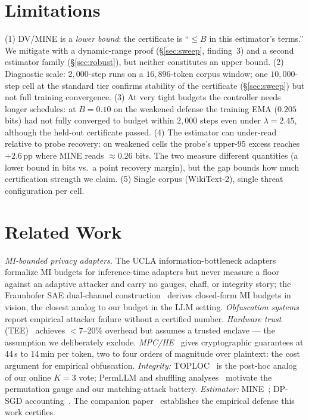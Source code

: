\documentclass[10pt]{article}
\begin{document}
\section{Limitations}
\label{sec:limits}
(1) DV/MINE is a \emph{lower bound}: the certificate is ``$\le B$ in this
estimator's terms.''  We mitigate with a dynamic-range proof
(\S\ref{sec:sweep}, finding~3) and a second estimator family
(\S\ref{sec:robust}), but neither constitutes an upper bound.
(2) Diagnostic scale: $2{,}000$-step runs on a $16{,}896$-token corpus
window; one $10{,}000$-step cell at the standard tier confirms stability
of the certificate (\S\ref{sec:sweep}) but not full training
convergence.
(3) At very tight budgets the controller needs longer schedules: at
$B{=}0.10$ on the weakened defense the training EMA ($0.205$ bits) had
not fully converged to budget within $2{,}000$ steps even under
$\lambda = 2.45$, although the held-out certificate passed.
(4) The estimator can under-read relative to probe recovery: on weakened
cells the probe's upper-95 excess reaches $+2.6$\,pp where MINE reads
$\approx 0.26$ bits.  The two measure different quantities (a lower bound
in bits vs.\ a point recovery margin), but the gap bounds how much
certification strength we claim.
(5) Single corpus (WikiText-2), single threat configuration per cell.

\section{Related Work}
\label{sec:related}
\emph{MI-bounded privacy adapters.} The UCLA information-bottleneck
adapters~\cite{uclaib} formalize MI budgets for inference-time adapters
but never measure a floor against an adaptive attacker and carry no
gauges, chaff, or integrity story; the Fraunhofer SAE dual-channel
construction~\cite{fraunhofersparse} derives closed-form MI budgets in
vision, the closest analog to our budget in the LLM setting.
\emph{Obfuscation systems}~\cite{aloepri, gelo, obfnet, sap, pidi}
report empirical attacker failure without a certified number.
\emph{Hardware trust} (TEE)~\cite{phalatee, ethtee, fastrack} achieves
$<$7--20\% overhead but assumes a trusted enclave — the assumption we
deliberately exclude.  \emph{MPC/HE}~\cite{sigma, bumblebee, nexus,
nimbus, puma, zkllm, zkgpt} gives cryptographic guarantees at 44\,s to
14\,min per token, two to four orders of magnitude over plaintext: the
cost argument for empirical obfuscation.  \emph{Integrity:}
TOPLOC~\cite{toploc} is the post-hoc analog of our online $K{=}3$ vote;
PermLLM and shuffling
analyses~\cite{permllm, shufflinginsecurity, permeq, permreversal}
motivate the permutation gauge and our matching-attack battery.
\emph{Estimator:} MINE~\cite{mine}; DP-SGD accounting~\cite{dp}.
The companion paper~\cite{ourswan} establishes the empirical defense
this work certifies.
\end{document}
